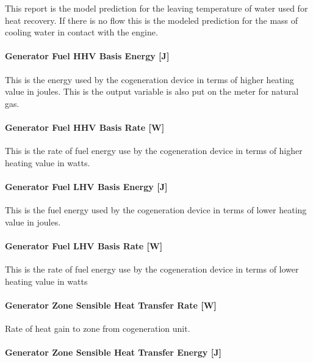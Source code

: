 This report is the model prediction for the leaving temperature of water used for heat recovery. If there is no flow this is the modeled prediction for the mass of cooling water in contact with the engine.

\paragraph{Generator Fuel HHV Basis Energy {[}J{]}}\label{generator-fuel-hhv-basis-energy-j-2}

This is the energy used by the cogeneration device in terms of higher heating value in joules. This is the output variable is also put on the meter for natural gas.

\paragraph{Generator Fuel HHV Basis Rate {[}W{]}}\label{generator-fuel-hhv-basis-rate-w-2}

This is the rate of fuel energy use by the cogeneration device in terms of higher heating value in watts.

\paragraph{Generator Fuel LHV Basis Energy {[}J{]}}\label{generator-fuel-lhv-basis-energy-j}

This is the fuel energy used by the cogeneration device in terms of lower heating value in joules.

\paragraph{Generator Fuel LHV Basis Rate {[}W{]}}\label{generator-fuel-lhv-basis-rate-w}

This is the rate of fuel energy use by the cogeneration device in terms of lower heating value in watts

\paragraph{Generator Zone Sensible Heat Transfer Rate {[}W{]}}\label{generator-zone-sensible-heat-transfer-rate-w}

Rate of heat gain to zone from cogeneration unit.

\paragraph{Generator Zone Sensible Heat Transfer Energy {[}J{]}}\label{generator-zone-sensible-heat-transfer-energy-j}


